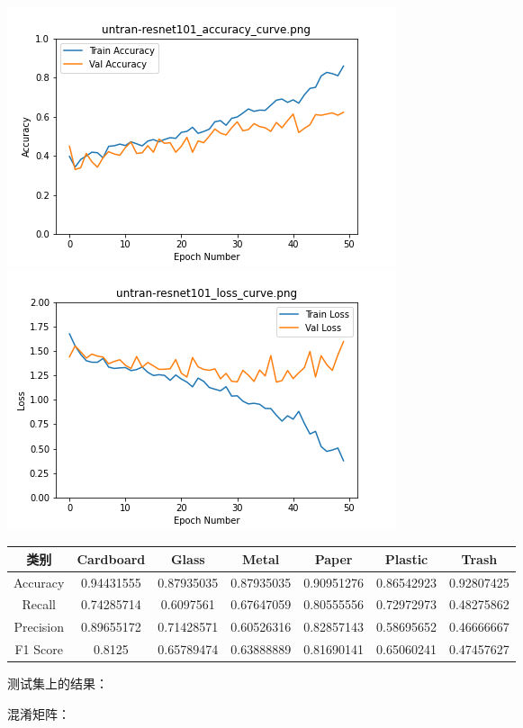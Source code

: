 \documentclass[UTF8]{ctexart}
\begin{document}
\includegraphics[scale=0.5]{image/untran-resnet101_accuracy_curve.png} 
\includegraphics[scale=0.5]{image/untran-resnet101_loss_curve.png}

\begin{tabular}{|c|c|c|c|c|c|c|}
\hline 
类别 & Cardboard & Glass & Metal & Paper & Plastic & Trash \\ 
\hline 
Accuracy &0.94431555& 0.87935035 &0.87935035& 0.90951276& 0.86542923& 0.92807425\\
 \hline 
Recall &0.74285714& 0.6097561&  0.67647059& 0.80555556& 0.72972973& 0.48275862\\ 
\hline 
Precision &0.89655172& 0.71428571 &0.60526316& 0.82857143& 0.58695652& 0.46666667\\ 
\hline 
F1 Score &0.8125&     0.65789474 &0.63888889& 0.81690141& 0.65060241& 0.47457627 \\ 
\hline 
\end{tabular}



测试集上的结果：


混淆矩阵：
\end{document}
